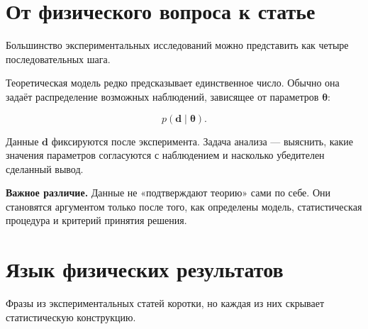 \documentclass[
  russian,
  letterpaper,
]{scrbook}
\begin{document}
\section{От физического вопроса к
статье}\label{ux43eux442-ux444ux438ux437ux438ux447ux435ux441ux43aux43eux433ux43e-ux432ux43eux43fux440ux43eux441ux430-ux43a-ux441ux442ux430ux442ux44cux435}

Большинство экспериментальных исследований можно представить как четыре
последовательных шага.

Теоретическая модель редко предсказывает единственное число. Обычно она
задаёт распределение возможных наблюдений, зависящее от параметров
\(\boldsymbol{\theta}\):

\[
p(\mathbf d\mid \boldsymbol{\theta}).
\]

Данные \(\mathbf d\) фиксируются после эксперимента. Задача анализа ---
выяснить, какие значения параметров согласуются с наблюдением и
насколько убедителен сделанный вывод.

\textbf{Важное различие.} Данные не «подтверждают теорию» сами по себе.
Они становятся аргументом только после того, как определены модель,
статистическая процедура и критерий принятия решения.

\section{Язык физических
результатов}\label{ux44fux437ux44bux43a-ux444ux438ux437ux438ux447ux435ux441ux43aux438ux445-ux440ux435ux437ux443ux43bux44cux442ux430ux442ux43eux432}

Фразы из экспериментальных статей коротки, но каждая из них скрывает
статистическую конструкцию.
\end{document}
